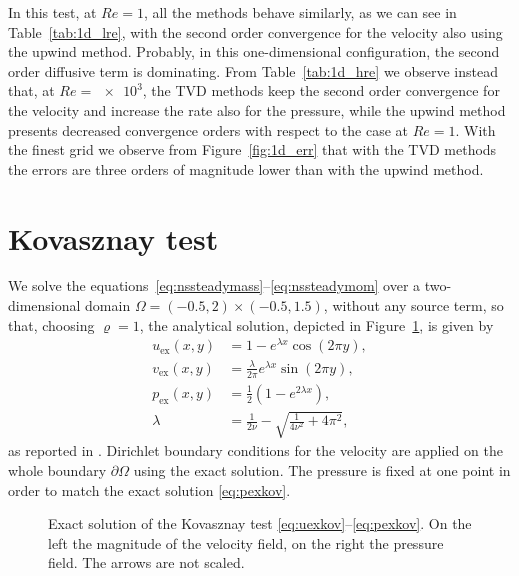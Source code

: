 In this test, at $Re=1$, all the methods behave similarly, as we 
can see in Table~\ref{tab:1d_lre}, with the second order convergence for the 
velocity also using the upwind method. Probably, in this one-dimensional 
configuration, the second order diffusive term is dominating. From 
Table~\ref{tab:1d_hre} we observe instead that, at $Re=\num{e3}$, the TVD methods keep the second order 
convergence for the velocity and increase the rate also for the pressure, while 
the upwind method presents decreased convergence orders with respect to the case at $Re=1$. With the finest grid we observe from 
Figure~\ref{fig:1d_err} that with the TVD methods the errors are three orders of 
magnitude lower than with the upwind method.

%
\section{Kovasznay test}
We solve the equations~\eqref{eq:nssteadymass}--\eqref{eq:nssteadymom} over a 
two-dimensional domain $\Omega=(-0.5, 2) \times (-0.5,1.5)$, without any source 
term, so that, choosing $\varrho=1$, the analytical solution, depicted in 
Figure~\ref{fig:kovexact}, is given by
\begin{align}
\label{eq:uexkov} u_\text{ex}(x,y) &= 1-e^{\lambda x} \cos (2 \pi y),\\
v_\text{ex}(x,y) &= \frac{\lambda}{2\pi} e^{\lambda x} \sin (2\pi y),\\
\label{eq:pexkov}	p_\text{ex}(x,y) &= \frac{1}{2}(1 -e^{2\lambda x}),\\
\lambda &= \frac{1}{2 \nu} - \sqrt{\frac{1}{4 \nu^2} + 4\pi^2},
\end{align}
as reported in \cite{test:kovasznay}.
Dirichlet boundary conditions for the velocity are applied on the whole 
boundary $\partial \Omega$ using the exact solution. The pressure is fixed at 
one point in order to match the exact solution \eqref{eq:pexkov}.
\begin{figure}
	\centering
	\caption[Exact solution of the Kovasznay test]{Exact solution of the 
	Kovasznay test \eqref{eq:uexkov}--\eqref{eq:pexkov}. On the left the 
	magnitude of the velocity field, on the 
	right the pressure field. The arrows are not scaled.}
	\label{fig:kovexact}
\end{figure}

